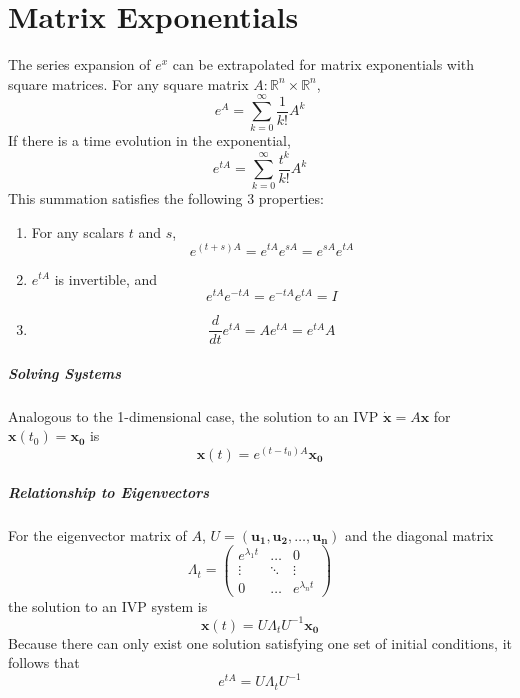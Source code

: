\documentclass[11pt]{article}
\begin{document}
\section{Matrix Exponentials}
	The series expansion of $e^x$ can be extrapolated for matrix exponentials with square matrices. For any square matrix $A: \mathbb{R}^n \times \mathbb{R}^n$,
	\begin{equation}
		e^A = \sum_{k=0}^\infty \frac{1}{k!}A^k
	\end{equation}
	If there is a time evolution in the exponential,
	\begin{equation}
		e^{tA} = \sum_{k=0}^\infty \frac{t^k}{k!}A^k
	\end{equation}
	This summation satisfies the following 3 properties:
	\begin{enumerate}
		\item For any scalars $t$ and $s$,
			\begin{equation}
				e^{(t+s)A} = e^{tA}e^{sA} = e^{sA}e^{tA}
			\end{equation}
		\item $e^{tA}$ is invertible, and
			\begin{equation}
				e^{tA}e^{-tA} = e^{-tA}e^{tA} = I
			\end{equation}
		\item
			\begin{equation}
				\frac{d}{dt}e^{tA} = Ae^{tA} = e^{tA}A
			\end{equation}
	\end{enumerate}
	
	\subparagraph{Solving Systems} Analogous to the 1-dimensional case, the solution to an IVP $\dot{\mathbf{x}} = A\mathbf{x}$ for $\mathbf{x}(t_0) = \mathbf{x_0}$ is
	\begin{equation}
		\mathbf{x}(t) = e^{(t - t_0)A}\mathbf{x_0}
	\end{equation}
	
	\subparagraph{Relationship to Eigenvectors} For the eigenvector matrix of $A$, $U = (\mathbf{u_1}, \mathbf{u_2}, \ldots ,\mathbf{u_n})$ and the diagonal matrix
	\begin{equation}
		\Lambda_t = \begin{pmatrix}
			e^{\lambda_1 t} & \ldots & 0\\
			\vdots & \ddots & \vdots\\
			0 & \ldots & e^{\lambda_n t}
		\end{pmatrix}
	\end{equation}
	the solution to an IVP system is
	\begin{equation}
		\mathbf{x}(t) = U\Lambda_t U^{-1}\mathbf{x_0}
	\end{equation}
	Because there can only exist one solution satisfying one set of initial conditions, it follows that
	\begin{equation}
		e^{tA} = U\Lambda_t U^{-1}
	\end{equation}
\end{document}
